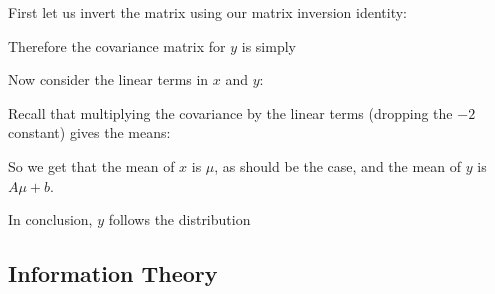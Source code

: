 \documentclass[12pt]{article}
\begin{document}
First let us invert the matrix using our matrix inversion identity:


Therefore the covariance matrix for $y$ is simply 


Now consider the linear terms in $x$ and $y$:

Recall that multiplying the covariance by the linear terms (dropping the $-2$ constant) gives the means:


So we get that the mean of $x$ is $\mu$, as should be the case, and the mean of $y$ is $A \mu +b$.

In conclusion, $y$ follows the distribution


\subsection{Information Theory}
\end{document}
